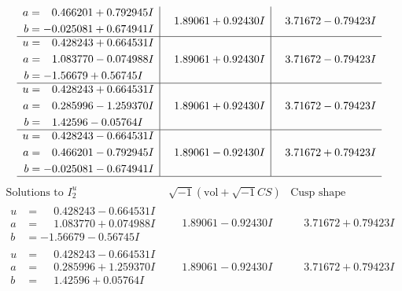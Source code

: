 \documentclass[1p]{elsarticle_modified}
\theoremstyle{definition}
\newcommand{\I}{\sqrt{-1}}
\begin{document}
$$\begin{array}{c|c|c}
\begin{aligned}
a &= \phantom{-}0.466201 + 0.792945 I \\
b &= -0.025081 + 0.674941 I\end{aligned}
 & \phantom{-}1.89061 + 0.92430 I & \phantom{-}3.71672 - 0.79423 I \\ \hline\begin{aligned}
u &= \phantom{-}0.428243 + 0.664531 I \\
a &= \phantom{-}1.083770 - 0.074988 I \\
b &= -1.56679 + 0.56745 I\end{aligned}
 & \phantom{-}1.89061 + 0.92430 I & \phantom{-}3.71672 - 0.79423 I \\ \hline\begin{aligned}
u &= \phantom{-}0.428243 + 0.664531 I \\
a &= \phantom{-}0.285996 - 1.259370 I \\
b &= \phantom{-}1.42596 - 0.05764 I\end{aligned}
 & \phantom{-}1.89061 + 0.92430 I & \phantom{-}3.71672 - 0.79423 I \\ \hline\begin{aligned}
u &= \phantom{-}0.428243 - 0.664531 I \\
a &= \phantom{-}0.466201 - 0.792945 I \\
b &= -0.025081 - 0.674941 I\end{aligned}
 & \phantom{-}1.89061 - 0.92430 I & \phantom{-}3.71672 + 0.79423 I\\
 \hline 
 \end{array}$$\newpage$$\begin{array}{c|c|c}  
\text{Solutions to }I^u_{2}& \I (\text{vol} + \sqrt{-1}CS) & \text{Cusp shape}\\
 \hline 
\begin{aligned}
u &= \phantom{-}0.428243 - 0.664531 I \\
a &= \phantom{-}1.083770 + 0.074988 I \\
b &= -1.56679 - 0.56745 I\end{aligned}
 & \phantom{-}1.89061 - 0.92430 I & \phantom{-}3.71672 + 0.79423 I \\ \hline\begin{aligned}
u &= \phantom{-}0.428243 - 0.664531 I \\
a &= \phantom{-}0.285996 + 1.259370 I \\
b &= \phantom{-}1.42596 + 0.05764 I\end{aligned}
 & \phantom{-}1.89061 - 0.92430 I & \phantom{-}3.71672 + 0.79423 I \\ \hline\begin{aligned}

\end{aligned}
\end{array}$$
\end{document}

